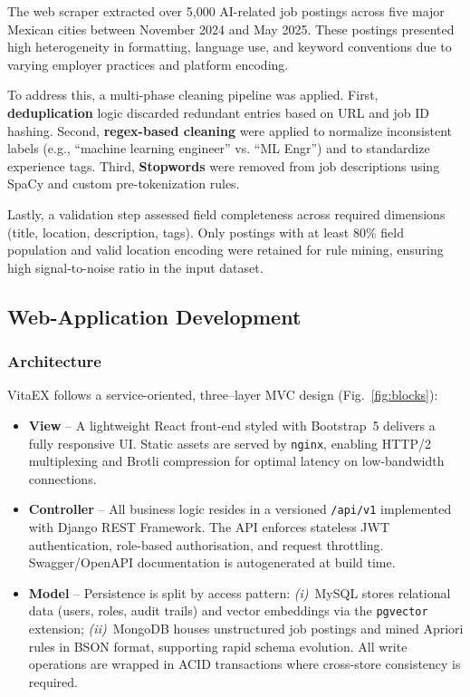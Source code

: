 \documentclass{svproc} %
\begin{document}
	The web scraper extracted over 5,000 AI-related job postings across five major Mexican cities between November 2024 and May 2025. These postings presented high heterogeneity in formatting, language use, and keyword conventions due to varying employer practices and platform encoding.
	
	To address this, a multi-phase cleaning pipeline was applied. First, \textbf{deduplication} logic discarded redundant entries based on URL and job ID hashing. Second, \textbf{regex-based cleaning} were applied to normalize inconsistent labels (e.g., ``machine learning engineer'' vs. ``ML Engr'') and to standardize experience tags. Third, \textbf{Stopwords} were removed from job descriptions using SpaCy and custom pre-tokenization rules.
	
	Lastly, a validation step assessed field completeness across required dimensions (title, location, description, tags). Only postings with at least 80\% field population and valid location encoding were retained for rule mining, ensuring high signal-to-noise ratio in the input dataset.
	
	
	\subsection{Web-Application Development}
	\label{ssec:web_dev}
	
	\subsubsection{Architecture}
	VitaEX follows a service-oriented, three–layer MVC design (Fig.~\ref{fig:blocks}):
	\begin{itemize}
		\item \textbf{View} – A lightweight React front-end styled with Bootstrap~5 delivers a fully
		responsive UI.  Static assets are served by \texttt{nginx}, enabling HTTP/2
		multiplexing and Brotli compression for optimal latency on low-bandwidth connections.
		\item \textbf{Controller} – All business logic resides in a versioned \texttt{/api/v1}
		implemented with Django REST Framework.  The API enforces stateless JWT
		authentication, role-based authorisation, and request throttling.  Swagger/OpenAPI
		documentation is autogenerated at build time.
		\item \textbf{Model} – Persistence is split by access pattern:  
		\emph{(i)}~MySQL stores relational data (users, roles, audit trails) and vector
		embeddings via the \texttt{pgvector} extension;  
		\emph{(ii)}~MongoDB houses unstructured job postings and mined Apriori rules in BSON
		format, supporting rapid schema evolution.  
		All write operations are wrapped in ACID transactions where cross-store consistency
		is required.
	\end{itemize}
	
\end{document}

